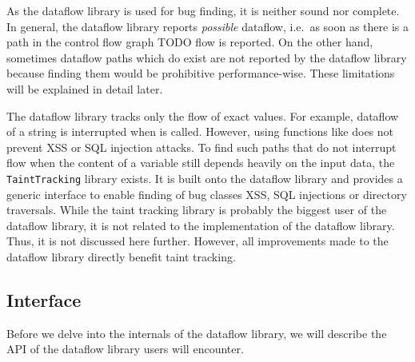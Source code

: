 As the dataflow library is used for bug finding, it is neither sound nor complete.
In general, the dataflow library reports \emph{possible} dataflow, i.e.\ as soon
as there is a path in the control flow graph TODO flow is reported.
On the other hand, sometimes dataflow paths which do exist are not reported by the 
dataflow library because finding them would be prohibitive performance-wise.
These limitations will be explained in detail later. 

The dataflow library tracks only the flow of exact values.
For example, dataflow of a string is interrupted when  is called.
However, using functions like  does not prevent XSS or SQL injection attacks.
To find such paths that do not interrupt flow when the content of a variable still depends 
heavily on the input data, the \texttt{TaintTracking} library exists.
It is built onto the dataflow library and provides a generic interface to enable
finding of bug classes XSS, SQL injections or directory traversals.
While the taint tracking library is probably the biggest user of the dataflow library,
it is not related to the implementation of the dataflow library.
Thus, it is not discussed here further.
However, all improvements made to the dataflow library directly benefit taint tracking.

\subsection{Interface}
Before we delve into the internals of the dataflow library, we will describe the API 
of the dataflow library users will encounter. %

